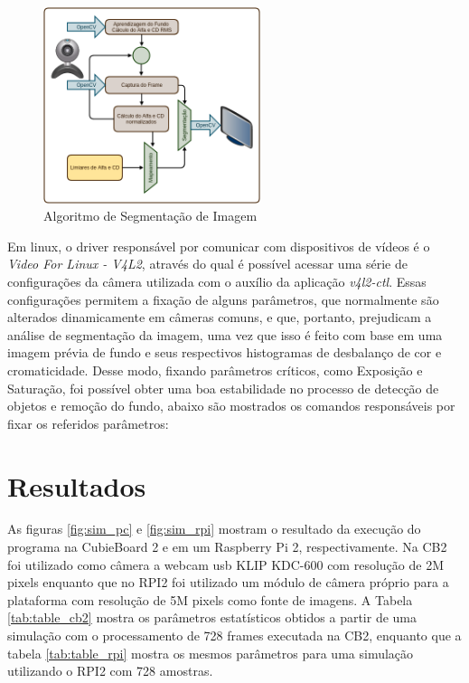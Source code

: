 \documentclass[conference]{IEEEtran}
\begin{document}


\begin{figure}[!t]
\centering
\includegraphics[width=2.5in]{Algoritmo}
\caption{Algoritmo de Segmentação de Imagem}
\label{fig:algoritmo}
\end{figure}

Em linux, o driver responsável por comunicar com dispositivos de vídeos é o \textit{Video For Linux - V4L2}, através do qual é possível acessar uma série de configurações da câmera utilizada com o auxílio da aplicação \textit{v4l2-ctl}. Essas configurações permitem a fixação de alguns parâmetros, que normalmente são alterados dinamicamente em câmeras comuns, e que, portanto, prejudicam a análise de segmentação da imagem, uma vez que isso é feito com base em uma imagem prévia de fundo e seus respectivos histogramas de desbalanço de cor e cromaticidade. Desse modo, fixando parâmetros críticos, como Exposição e Saturação, foi possível obter uma boa estabilidade no processo de detecção de objetos e remoção do fundo, abaixo são mostrados os comandos responsáveis por fixar os referidos parâmetros:



\section{Resultados}
As figuras \ref{fig:sim_pc} e \ref{fig:sim_rpi} mostram o resultado da execução do programa na CubieBoard 2 e em um Raspberry Pi 2, respectivamente. Na CB2 foi utilizado como câmera a webcam usb KLIP KDC-600 com resolução de 2M pixels enquanto que no RPI2 foi utilizado um módulo de câmera próprio para a plataforma com resolução de 5M pixels como fonte de imagens. A Tabela \ref{tab:table_cb2} mostra os parâmetros estatísticos obtidos a partir de uma simulação com o processamento de 728 frames executada na CB2, enquanto que  a tabela \ref{tab:table_rpi} mostra os mesmos parâmetros para uma simulação utilizando o RPI2 com 728 amostras.
\end{document}
